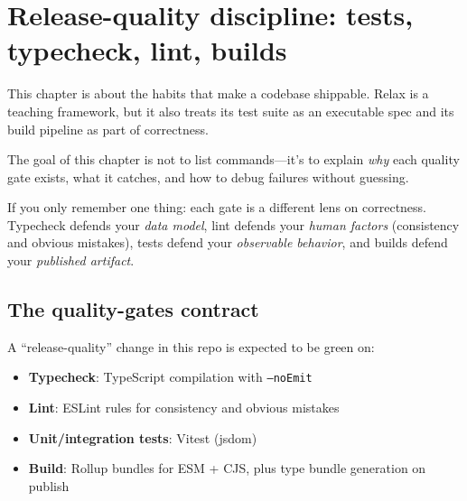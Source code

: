 \chapter{Release-quality discipline: tests, typecheck, lint, builds}
\label{ch:release-quality}

This chapter is about the habits that make a codebase shippable.
Relax is a teaching framework, but it also treats its test suite as an executable spec and its build pipeline as part of correctness.

The goal of this chapter is not to list commands---it's to explain \emph{why} each quality gate exists, what it catches, and how to debug failures without guessing.

If you only remember one thing: each gate is a different lens on correctness.
Typecheck defends your \emph{data model}, lint defends your \emph{human factors} (consistency and obvious mistakes), tests defend your \emph{observable behavior}, and builds defend your \emph{published artifact}.

\section{The quality-gates contract}

A ``release-quality'' change in this repo is expected to be green on:

\begin{itemize}
\item \textbf{Typecheck}: TypeScript compilation with \texttt{--noEmit}
\item \textbf{Lint}: ESLint rules for consistency and obvious mistakes
\item \textbf{Unit/integration tests}: Vitest (jsdom)
\item \textbf{Build}: Rollup bundles for ESM + CJS, plus type bundle generation on publish
\end{itemize}

